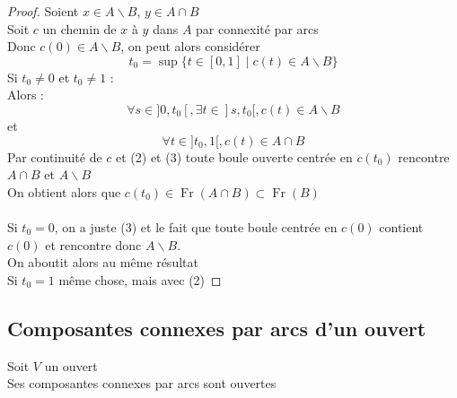 \documentclass{article}
\begin{document}
\begin{flushleft}
\begin{proof}
Soient $x \in A \backslash B$, $y \in A \cap B$\\
Soit $c$ un chemin de $x$ à $y$ dans $A$ par connexité par arcs\\
Donc $c(0) \in A \backslash B$, on peut alors considérer
\begin{equation*}
    t_0 = \sup \{ t \in [0, 1] \mid c(t) \in A \backslash B \}
\end{equation*}
Si $t_0 \neq 0$ et $t_0 \neq 1$ :\\
Alors :
\begin{equation}
    \forall s \in ]0, t_0[, \exists t \in ]s, t_0[,
c(t) \in A \backslash B
\end{equation}
et
\begin{equation}
\forall t \in ]t_0, 1[, c(t) \in A \cap B
\end{equation}
Par continuité de $c$ et (2) et (3) toute boule ouverte centrée en $c(t_0)$ rencontre $A \cap B$ et $A \backslash B$\\
On obtient alors que $c(t_0) \in \operatorname{Fr}(A \cap B) \subset \operatorname{Fr}(B)$
\\~\\
Si $t_0 = 0$, on a juste (3) et le fait que toute boule centrée en $c(0)$
contient $c(0)$ et rencontre donc $A \backslash B$.\\
On aboutit alors au même résultat\\
Si $t_0 = 1$ même chose, mais avec (2)

\end{proof}

\subsection{Composantes connexes par arcs d'un ouvert}

\begin{tcolorbox}[colback = purple!20!white, colframe = purple!60!white, title = Proposition 2]
    Soit $V$ un ouvert\\
    Ses composantes connexes par arcs sont ouvertes
\end{tcolorbox}


\end{flushleft}
\end{document}
